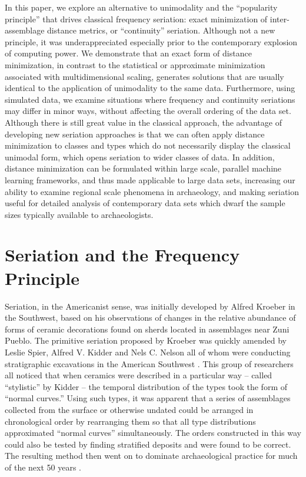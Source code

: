 In this paper, we explore an alternative to unimodality and the
``popularity principle'' that drives classical frequency seriation:
exact minimization of inter-assemblage distance metrics, or
``continuity'' seriation. Although not a new principle, it was
underappreciated especially prior to the contemporary explosion of
computing power. We demonstrate that an exact form of distance
minimization, in contrast to the statistical or approximate minimization
associated with multidimensional scaling, generates solutions that are
usually identical to the application of unimodality to the same data.
Furthermore, using simulated data, we examine situations where frequency
and continuity seriations may differ in minor ways, without affecting
the overall ordering of the data set. Although there is still great
value in the classical approach, the advantage of developing new
seriation approaches is that we can often apply distance minimization to
classes and types which do not necessarily display the classical
unimodal form, which opens seriation to wider classes of data. In
addition, distance minimization can be formulated within large scale,
parallel machine learning frameworks, and thus made applicable to large
data sets, increasing our ability to examine regional scale phenomena in archaeology, and making seriation useful for detailed analysis of contemporary data sets which dwarf the sample sizes typically available to archaeologists.

\section{Seriation and the Frequency
Principle}\label{multser:sec:seriation-and-the-frequency-principle}

Seriation, in the Americanist sense, was initially developed by Alfred
Kroeber \citep{Kroeber1916} in the Southwest, based on his observations
of changes in the relative abundance of forms of ceramic decorations
found on sherds located in assemblages near Zuni Pueblo. The primitive
seriation proposed by Kroeber was quickly amended by Leslie Spier,
Alfred V. Kidder and Nels C. Nelson all of whom were conducting
stratigraphic excavations in the American Southwest
\citep{Kidder1917, Nelson1916, Spier1917}. This group of researchers all
noticed that when ceramics were described in a particular way -- called
``stylistic'' by Kidder \citeyearpar{Kidder1917} -- the temporal
distribution of the types took the form of ``normal curves.'' Using such
types, it was apparent that a series of assemblages collected from the
surface or otherwise undated could be arranged in chronological order by
rearranging them so that all type distributions approximated ``normal
curves'' simultaneously. The orders constructed in this way could also
be tested by finding stratified deposits and were found to be correct.
The resulting method then went on to dominate archaeological practice
for much of the next 50 years \citep{lyman1997rise}.

